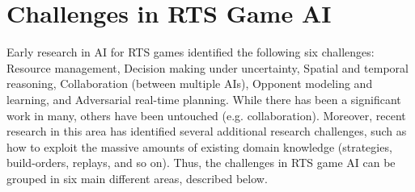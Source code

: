 \documentclass{llncs}
\begin{document}




\section*{Challenges in RTS Game AI}\label{subsec:challenges}

Early research  in AI  for RTS  games \cite{Buro03rts}  identified the
following six challenges: Resource management, Decision making under uncertainty, Spatial and temporal reasoning, Collaboration (between multiple AIs), Opponent modeling and learning, and Adversarial real-time planning. While there  has been  a significant  work in  many, others  have been
untouched (e.g. collaboration). Moreover, recent research in this area
has identified several additional research  challenges, such as how to
exploit the massive amounts  of existing domain knowledge (strategies,
build-orders,  replays,  and  so   on). Thus, the challenges in RTS game AI can be grouped in six main different areas, described below.
\end{document}
